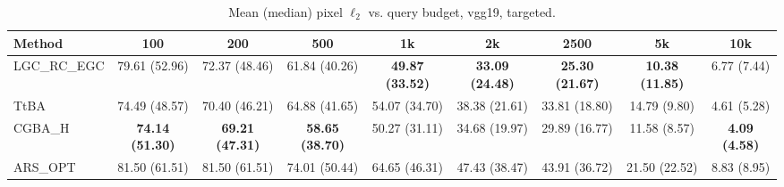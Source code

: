 \begin{table}[t]
\centering\footnotesize
\caption{Mean (median) pixel $\ell_2$ vs. query budget, vgg19, targeted.}
\begin{tabular}{lcccccccc}
\toprule
Method & 100 & 200 & 500 & 1k & 2k & 2500 & 5k & 10k \\
\midrule
LGC\_RC\_EGC & 79.61 (52.96) & 72.37 (48.46) & 61.84 (40.26) & \textbf{49.87 (33.52)} & \textbf{33.09 (24.48)} & \textbf{25.30 (21.67)} & \textbf{10.38 (11.85)} & 6.77 (7.44) \\
TtBA & 74.49 (48.57) & 70.40 (46.21) & 64.88 (41.65) & 54.07 (34.70) & 38.38 (21.61) & 33.81 (18.80) & 14.79 (9.80) & 4.61 (5.28) \\
CGBA\_H & \textbf{74.14 (51.30)} & \textbf{69.21 (47.31)} & \textbf{58.65 (38.70)} & 50.27 (31.11) & 34.68 (19.97) & 29.89 (16.77) & 11.58 (8.57) & \textbf{4.09 (4.58)} \\
ARS\_OPT & 81.50 (61.51) & 81.50 (61.51) & 74.01 (50.44) & 64.65 (46.31) & 47.43 (38.47) & 43.91 (36.72) & 21.50 (22.52) & 8.83 (8.95) \\
\bottomrule
\end{tabular}
\end{table}
